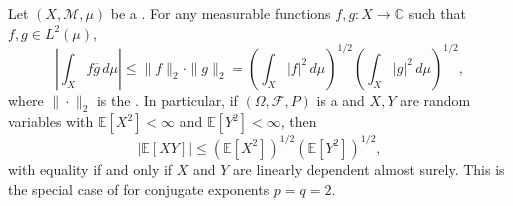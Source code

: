 \begin{proposition} \label{proposition:cauchy_schwarz_inequality_in_L_2}
Let $(X, \mathcal{M}, \mu)$ be a . For any measurable functions $f, g : X \to \mathbb{C}$ such that $f, g \in L^2(\mu)$,
$$\left|\int_X f \overline{g} \, d\mu\right| \leq \|f\|_2 \cdot \|g\|_2 = \left(\int_X |f|^2 \, d\mu\right)^{1/2} \left(\int_X |g|^2 \, d\mu\right)^{1/2},$$
where $\|\cdot\|_2$ is the . In particular, if $(\Omega, \mathcal{F}, P)$ is a  and $X, Y$ are random variables with $\mathbb{E}[X^2] < \infty$ and $\mathbb{E}[Y^2] < \infty$, then
$$|\mathbb{E}[XY]| \leq (\mathbb{E}[X^2])^{1/2} (\mathbb{E}[Y^2])^{1/2},$$
with equality if and only if $X$ and $Y$ are linearly dependent almost surely. This is the special case of  for conjugate exponents $p = q = 2$.
\end{proposition}

